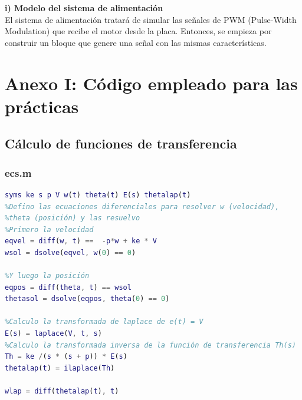 \documentclass[a4paper, 12pt]{article}
\begin{document}
\textbf{i) Modelo del sistema de alimentación}\\

El sistema de alimentación tratará de simular las señales de PWM (Pulse-Width Modulation) que recibe el motor desde la placa. Entonces, se empieza por construir un bloque que genere una señal con las mismas características.


\newpage



\section*{Anexo I: Código empleado para las prácticas}
\subsection*{Cálculo de funciones de transferencia}
\subsubsection*{ecs.m}
\begin{lstlisting}[language = MATLAB]
syms ke s p V w(t) theta(t) E(s) thetalap(t)
%Defino las ecuaciones diferenciales para resolver w (velocidad),
%theta (posición) y las resuelvo 
%Primero la velocidad
eqvel = diff(w, t) ==  -p*w + ke * V
wsol = dsolve(eqvel, w(0) == 0)

%Y luego la posición
eqpos = diff(theta, t) == wsol 
thetasol = dsolve(eqpos, theta(0) == 0) 

%Calculo la transformada de laplace de e(t) = V
E(s) = laplace(V, t, s) 
%Calculo la transformada inversa de la función de transferencia Th(s)
Th = ke /(s * (s + p)) * E(s) 
thetalap(t) = ilaplace(Th)

wlap = diff(thetalap(t), t)
\end{lstlisting}
\end{document}
